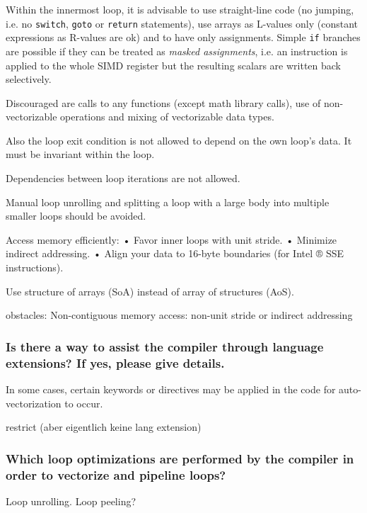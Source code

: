 \documentclass[11pt]{article}
\begin{document}
Within the innermost loop, it is advisable to use straight-line code (no jumping, i.e. no \texttt{switch}, \texttt{goto} or \texttt{return} statements), use arrays as L-values only (constant expressions as R-values are ok) and to have only assignments. Simple \texttt{if} branches are possible if they can be treated as \textit{masked assignments}, i.e. an instruction is applied to the whole SIMD register but the resulting scalars are written back selectively.

Discouraged are calls to any functions (except math library calls), use of non-vectorizable operations and mixing of vectorizable data types.

Also the loop exit condition is not allowed to depend on the own loop's data. It must be invariant within the loop.

Dependencies between loop iterations are not allowed.

Manual loop unrolling and splitting a loop with a large body into multiple smaller loops should be avoided.

Access memory efficiently:
• Favor inner loops with unit stride.
• Minimize indirect addressing.
• Align your data to 16-byte boundaries (for Intel ® SSE instructions).

Use structure of arrays (SoA) instead of array of structures (AoS).

obstacles:
Non-contiguous memory access: non-unit stride or indirect addressing


\subsubsection*{Is there a way to assist the compiler through language extensions? If yes, please give details.}
In some cases, certain keywords or directives may be applied in the code for auto-vectorization to occur.

restrict (aber eigentlich keine lang extension)

\subsubsection*{Which loop optimizations are performed by the compiler in order to vectorize and pipeline loops?}
Loop unrolling.
Loop peeling?
\end{document}
